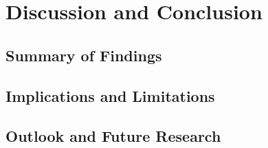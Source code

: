 \chapter{Discussion and Conclusion}
\label{ch:05_discussion}

\section{Summary of Findings}
\label{sec:05_discussion-findings}

\blindtext

\section{Implications and Limitations}
\label{sec:05_discussion-implications}

\blindtext

\section{Outlook and Future Research}
\label{sec:05_discussion-outlook}

\blindtext